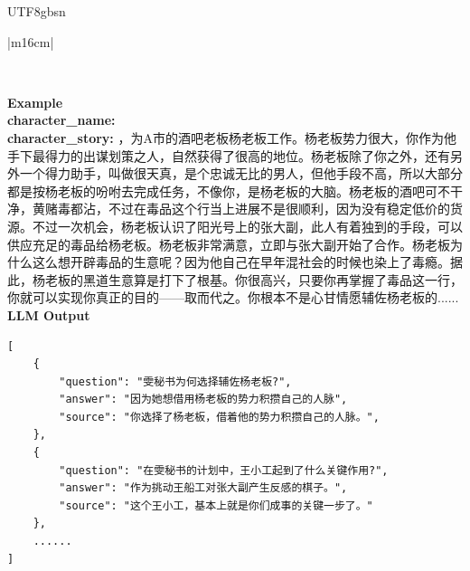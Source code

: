 \documentclass[11pt]{article}
\begin{document}
{\begin{CJK}{UTF8}{gbsn}
\begin{table}[ht!]
\begin{tabular}{|m{16cm}|}
\begin{minipage}[t]{\linewidth}
\begin{verbatim}
\end{verbatim}
\end{minipage} \\
\hline
{}  \textbf{Example}  \\
 \textbf{  character\_name:} \\
  \textbf{  character\_story:} ，为A市的酒吧老板杨老板工作。杨老板势力很大，你作为他手下最得力的出谋划策之人，自然获得了很高的地位。杨老板除了你之外，还有另外一个得力助手，叫做很天真，是个忠诚无比的男人，但他手段不高，所以大部分都是按杨老板的吩咐去完成任务，不像你，是杨老板的大脑。杨老板的酒吧可不干净，黄赌毒都沾，不过在毒品这个行当上进展不是很顺利，因为没有稳定低价的货源。不过一次机会，杨老板认识了阳光号上的张大副，此人有着独到的手段，可以供应充足的毒品给杨老板。杨老板非常满意，立即与张大副开始了合作。杨老板为什么这么想开辟毒品的生意呢？因为他自己在早年混社会的时候也染上了毒瘾。据此，杨老板的黑道生意算是打下了根基。你很高兴，只要你再掌握了毒品这一行，你就可以实现你真正的目的——取而代之。你根本不是心甘情愿辅佐杨老板的......\\

\hline
{}  \textbf{LLM Output}  \\
\hline
\begin{minipage}[t]{\linewidth}
\small\begin{verbatim}
[   
    {
        "question": "雯秘书为何选择辅佐杨老板?",
        "answer": "因为她想借用杨老板的势力积攒自己的人脉",
        "source": "你选择了杨老板，借着他的势力积攒自己的人脉。",
    },
    {
        "question": "在雯秘书的计划中，王小工起到了什么关键作用?",
        "answer": "作为挑动王船工对张大副产生反感的棋子。",
        "source": "这个王小工，基本上就是你们成事的关键一步了。"
    },
    ......
]


\end{verbatim}
\end{minipage}
\end{tabular}
\end{table}
\end{CJK}}
\end{document}
